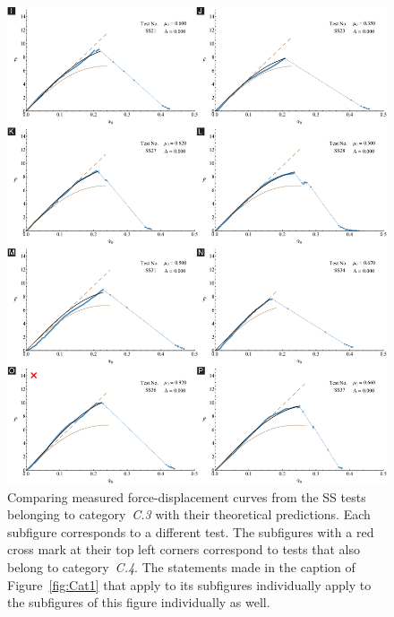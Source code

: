 \documentclass[preprint,10pt,times]{elsarticle}
\numberwithin{equation}{section}
\begin{document}
\begin{figure}
\begin{centering}
\includegraphics[width=1\textwidth]{../Figures_Submit/Cat3Sub2.pdf}
\par\end{centering}
\caption{\label{fig:Cat3}Comparing measured force-displacement curves from the SS tests belonging to category~\textit{C.3} with their theoretical predictions.
Each subfigure corresponds to a different test.
The subfigures with a red cross mark at their top left corners correspond to tests that also belong to category~\textit{C.4}.
The statements made in the caption of Figure~\ref{fig:Cat1} that apply  to its subfigures individually apply to the subfigures of this figure individually as well.}
\end{figure}
\end{document}
